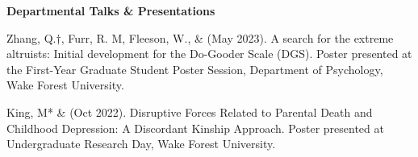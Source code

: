 \pagebreak
{\large \bf Departmental Talks \& Presentations}
\begin{etaremune}
\item Zhang, Q.$\dagger$, Furr, R. M, Fleeson, W., \& \meb (May 2023). A search for the extreme altruists: Initial development for the Do-Gooder Scale (DGS). Poster presented at the First-Year Graduate Student Poster Session, Department of Psychology, Wake Forest University.

\item King, M* \& \meb (Oct 2022). Disruptive Forces Related to Parental Death and Childhood Depression: A Discordant Kinship Approach. Poster presented at Undergraduate Research Day, Wake Forest University.


\end{etaremune}
